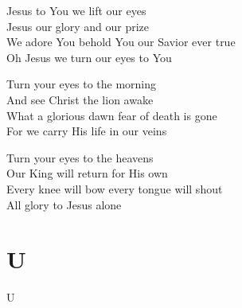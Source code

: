 \documentclass{beamer}
\begin{document}
{\begin{frame}{}
\end{frame}

\hypertarget{Turn your eyes upon Jesus[]C}{}
\begin{frame}{}
\fontsize{ 15 }{ 19 }\selectfont

Jesus to You we lift our eyes\\ 
Jesus our glory and our prize\\ 
We adore You behold You our Savior ever true\\ 
Oh Jesus we turn our eyes to You 

\end{frame}

\hypertarget{Turn your eyes upon Jesus[]3}{}
\begin{frame}{}
\fontsize{ 15 }{ 19 }\selectfont

Turn your eyes to the morning\\ 
And see Christ the lion awake\\ 
What a glorious dawn fear of death is gone\\ 
For we carry His life in our veins 

\end{frame}

\hypertarget{Turn your eyes upon Jesus[]4}{}
\begin{frame}{}
\fontsize{ 15 }{ 19 }\selectfont

Turn your eyes to the heavens\\ 
Our King will return for His own\\ 
Every knee will bow every tongue will shout\\ 
All glory to Jesus alone 

\end{frame}

}
\section{U}

\begin{frame}{U}
\begin{columns}

    


    


\end{columns}

\end{frame}
\end{document}
